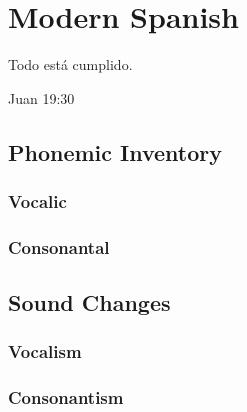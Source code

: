 \documentclass{report}[12pt]
\begin{document}
\thispagestyle{empty}

\pagebreak

\chapter{Modern Spanish}

\epigraph{Todo está cumplido.}{Juan 19:30}

\section{Phonemic Inventory}

\subsection{Vocalic}

\subsection{Consonantal}

\section{Sound Changes}

\subsection{Vocalism}

\subsection{Consonantism}

\begin{tcolorbox}[title=Lenition II]

\end{tcolorbox}

\begin{tcolorbox}[title=Betacism II]

\end{tcolorbox}

\begin{tcolorbox}[title=Simplication of Clusters]
  
\end{tcolorbox}

\begin{tcolorbox}[title=Deaffrication]

\end{tcolorbox}
\end{document}
